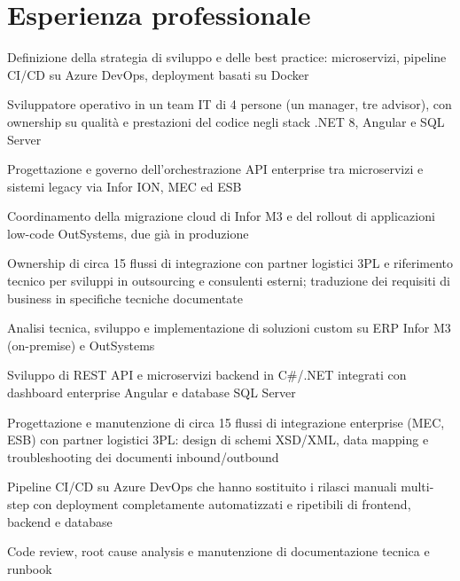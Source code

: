 \documentclass[a4paper,10pt]{article}
\begin{document}
\section{Esperienza professionale}

\begin{cvitems}
  \item Definizione della strategia di sviluppo e delle best practice: microservizi, pipeline CI/CD su Azure DevOps, deployment basati su Docker
  \item Sviluppatore operativo in un team IT di 4 persone (un manager, tre advisor), con ownership su qualità e prestazioni del codice negli stack .NET 8, Angular e SQL Server
  \item Progettazione e governo dell'orchestrazione API enterprise tra microservizi e sistemi legacy via Infor ION, MEC ed ESB
  \item Coordinamento della migrazione cloud di Infor M3 e del rollout di applicazioni low-code OutSystems, due già in produzione
  \item Ownership di circa 15 flussi di integrazione con partner logistici 3PL e riferimento tecnico per sviluppi in outsourcing e consulenti esterni; traduzione dei requisiti di business in specifiche tecniche documentate
\end{cvitems}

\begin{cvitems}
  \item Analisi tecnica, sviluppo e implementazione di soluzioni custom su ERP Infor M3 (on-premise) e OutSystems
  \item Sviluppo di REST API e microservizi backend in C\#/.NET integrati con dashboard enterprise Angular e database SQL Server
  \item Progettazione e manutenzione di circa 15 flussi di integrazione enterprise (MEC, ESB) con partner logistici 3PL: design di schemi XSD/XML, data mapping e troubleshooting dei documenti inbound/outbound
  \item Pipeline CI/CD su Azure DevOps che hanno sostituito i rilasci manuali multi-step con deployment completamente automatizzati e ripetibili di frontend, backend e database
  \item Code review, root cause analysis e manutenzione di documentazione tecnica e runbook
\end{cvitems}
\end{document}
